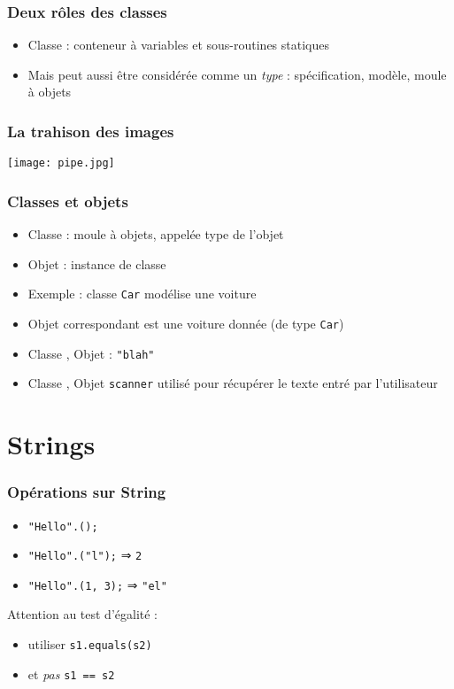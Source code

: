 \documentclass[english, french]{beamer}
\begin{document}
\begin{frame}
	\frametitle{Deux rôles des classes}
	\begin{itemize}
		\item Classe : conteneur à variables et sous-routines statiques
		\item Mais peut aussi être considérée comme un \emph{type} : spécification, modèle, moule à objets
	\end{itemize}
\end{frame}

\begin{frame}
	\frametitle{La trahison des images}
	\centering\texttt{[image: pipe.jpg]}
\end{frame}

\begin{frame}
	\frametitle{Classes et objets}
	\begin{itemize}
		\item Classe : moule à objets, appelée type de l’objet
		\item Objet : instance de classe
		\item Exemple : classe \texttt{Car} modélise une voiture
		\item Objet correspondant est une voiture donnée (de type \texttt{Car})
		\item Classe , Objet : \texttt{"blah"}
		\item Classe , Objet \texttt{scanner} utilisé pour récupérer le texte entré par l’utilisateur
	\end{itemize}
\end{frame}

\section{Strings}
\begin{frame}
	\frametitle{Opérations sur String}
	\begin{itemize}
		\item \texttt{"Hello".();}
		\item \texttt{"Hello".("l");} ⇒ \pause \texttt{2}
		\item \texttt{"Hello".(1, 3);} ⇒ \pause \texttt{"el"}
	\end{itemize}
	Attention au test d’égalité :
	\begin{itemize}
		\item[\mkkOK] utiliser \texttt{s1.equals(s2)} 
		\item[\mkkNO] et \emph{pas} \texttt{s1 == s2}
	\end{itemize}
\end{frame}
\end{document}

